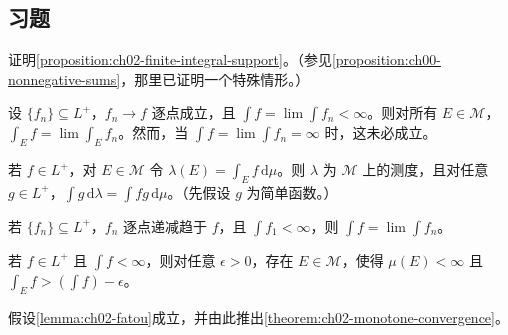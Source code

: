 \documentclass[../../main.tex]{subfiles}%
\begin{document}
\subsection*{习题}
\begin{exercise}\label{exercise:ch02-finite-integral-support}
证明\cref{proposition:ch02-finite-integral-support}。（参见\cref{proposition:ch00-nonnegative-sums}，那里已证明一个特殊情形。）
\end{exercise}
\begin{exercise}\label{exercise:ch02-integral-restriction-convergence}
设 $\{f_n\}\subseteq L^+$，$f_n\to f$ 逐点成立，且 $\int f=\lim\int f_n<\infty$。则对所有 $E\in\mathscr{M}$，$\int_E f=\lim\int_E f_n$。然而，当 $\int f=\lim\int f_n=\infty$ 时，这未必成立。
\end{exercise}
\begin{exercise}\label{exercise:ch02-density-measure}
若 $f\in L^+$，对 $E\in\mathscr{M}$ 令 $\lambda(E)=\int_E f\,\mathrm{d}\mu$。则 $\lambda$ 为 $\mathscr{M}$ 上的测度，且对任意 $g\in L^+$，$\int g\,\mathrm{d}\lambda=\int fg\,\mathrm{d}\mu$。（先假设 $g$ 为简单函数。）
\end{exercise}
\begin{exercise}\label{exercise:ch02-decreasing-convergence}
若 $\{f_n\}\subseteq L^+$，$f_n$ 逐点递减趋于 $f$，且 $\int f_1<\infty$，则 $\int f=\lim\int f_n$。
\end{exercise}
\begin{exercise}\label{exercise:ch02-finite-measure-restriction}
若 $f\in L^+$ 且 $\int f<\infty$，则对任意 $\epsilon>0$，存在 $E\in\mathscr{M}$，使得 $\mu(E)<\infty$ 且 $\int_E f>(\int f)-\epsilon$。
\end{exercise}
\begin{exercise}\label{exercise:ch02-fatou-implies-monotone}
假设\cref{lemma:ch02-fatou}成立，并由此推出\cref{theorem:ch02-monotone-convergence}。
\end{exercise}
\end{document}
